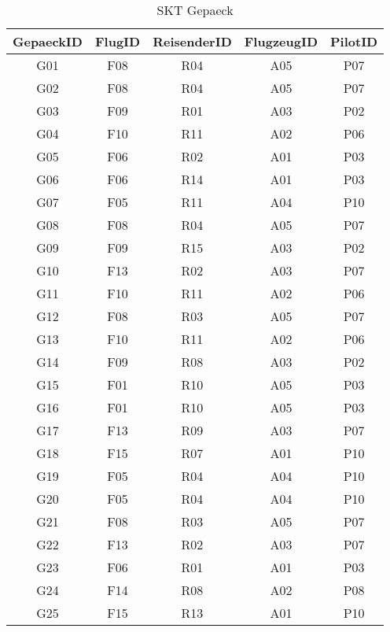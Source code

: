 \begin{table}[htbp]
\centering
\begin{tabular}{|c|c|c|c|c|}
\hline
\bfseries GepaeckID&\bfseries FlugID&\bfseries ReisenderID&\bfseries FlugzeugID&\bfseries PilotID\\
\hline
G01&F08&R04&A05&P07\\
\hline
G02&F08&R04&A05&P07\\
\hline
G03&F09&R01&A03&P02\\
\hline
G04&F10&R11&A02&P06\\
\hline
G05&F06&R02&A01&P03\\
\hline
G06&F06&R14&A01&P03\\
\hline
G07&F05&R11&A04&P10\\
\hline
G08&F08&R04&A05&P07\\
\hline
G09&F09&R15&A03&P02\\
\hline
G10&F13&R02&A03&P07\\
\hline
G11&F10&R11&A02&P06\\
\hline
G12&F08&R03&A05&P07\\
\hline
G13&F10&R11&A02&P06\\
\hline
G14&F09&R08&A03&P02\\
\hline
G15&F01&R10&A05&P03\\
\hline
G16&F01&R10&A05&P03\\
\hline
G17&F13&R09&A03&P07\\
\hline
G18&F15&R07&A01&P10\\
\hline
G19&F05&R04&A04&P10\\
\hline
G20&F05&R04&A04&P10\\
\hline
G21&F08&R03&A05&P07\\
\hline
G22&F13&R02&A03&P07\\
\hline
G23&F06&R01&A01&P03\\
\hline
G24&F14&R08&A02&P08\\
\hline
G25&F15&R13&A01&P10\\
\hline
\end{tabular}
\caption{SKT Gepaeck}
\label{tab:SKTGepaeck}
\end{table}
%
